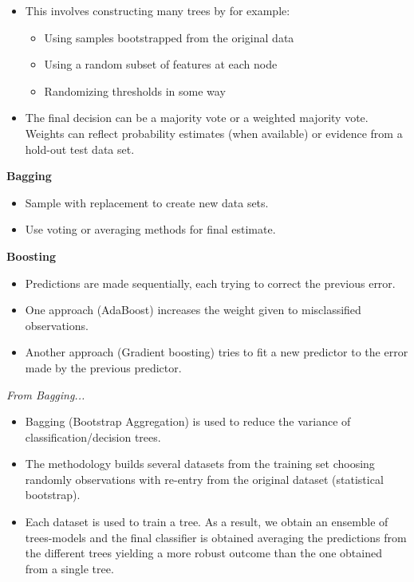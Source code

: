 \begin{itemize}
    \item This involves constructing many trees by for example:
          \begin{itemize}
              \item Using samples bootstrapped from the original data
              \item Using a random subset of features at each node
              \item Randomizing thresholds in some way
          \end{itemize}
    \item The final decision can be a majority vote or a weighted majority vote. Weights can reflect probability estimates (when available) or evidence from a hold-out test data set.
\end{itemize}

\textbf{Bagging}
\begin{itemize}
    \item Sample with replacement to create new data sets.
    \item Use voting or averaging methods for final estimate.
\end{itemize}

\textbf{Boosting}
\begin{itemize}
    \item Predictions are made sequentially, each trying to correct the previous error.
    \item One approach (AdaBoost) increases the weight given to misclassified observations.
    \item Another approach (Gradient boosting) tries to fit a new predictor to the error made by the previous predictor.
\end{itemize}

\textit{From Bagging...}
\begin{itemize}
    \item Bagging (Bootstrap Aggregation) is used to reduce the variance of classification/decision trees.
    \item The methodology builds several datasets from the training set choosing randomly observations with re-entry from the original dataset (statistical bootstrap).
    \item Each dataset is used to train a tree. As a result, we obtain an ensemble of trees-models and the final classifier is obtained averaging the predictions from the different trees yielding a more robust outcome than the one obtained from a single tree.
\end{itemize}


